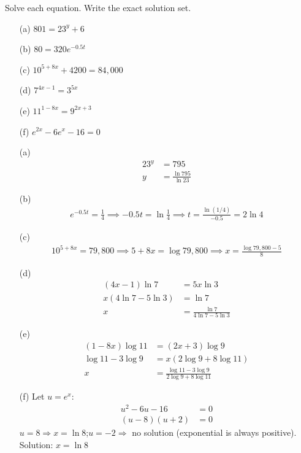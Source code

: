 \documentclass{ximera}
\begin{document}
\begin{problem}
Solve each equation. Write the exact solution set.
\begin{enumerate}
  \item[(a)] $801 = 23^y + 6$
  \medskip
  \item[(b)] $80 = 320e^{-0.5t}$
  \medskip
  \item[(c)] $10^{5+8x} + 4200 = 84{,}000$
  \medskip
  \item[(d)] $7^{4x-1} = 3^{5x}$
  \medskip
  \item[(e)] $11^{1-8x} = 9^{2x+3}$
  \medskip
  \item[(f)] $e^{2x} - 6e^x - 16 = 0$ 
\end{enumerate}

\begin{solution}
\begin{enumerate}
  \item[(a)]
  \begin{align*}
    23^y &= 795\\
    y &= \frac{\ln 795}{\ln 23}
  \end{align*}

  \item[(b)]
  \begin{align*}
    e^{-0.5t} = \tfrac{1}{4} \implies -0.5t = \ln\tfrac{1}{4} \implies t = \frac{\ln(1/4)}{-0.5} = 2\ln 4
  \end{align*}

  \item[(c)]
  \begin{align*}
    10^{5+8x} = 79{,}800 \implies 5+8x = \log 79{,}800 \implies x = \frac{\log 79{,}800 - 5}{8}
  \end{align*}

  \item[(d)]
  \begin{align*}
    (4x-1)\ln 7 &= 5x\ln 3\\
    x(4\ln 7 - 5\ln 3) &= \ln 7\\
    x &= \frac{\ln 7}{4\ln 7 - 5\ln 3}
  \end{align*}

  \item[(e)]
  \begin{align*}
    (1-8x)\log 11 &= (2x+3)\log 9\\
    \log 11 - 3\log 9 &= x(2\log 9 + 8\log 11)\\
    x &= \frac{\log 11 - 3\log 9}{2\log 9 + 8\log 11}
  \end{align*}

  \item[(f)] Let $u = e^x$:
  \begin{align*}
    u^2 - 6u - 16 &= 0\\
    (u-8)(u+2) &= 0
  \end{align*}
  $u=8 \Rightarrow x=\ln 8$;\quad $u=-2 \Rightarrow$ no solution (exponential is always positive).\\
  Solution: $\boxed{x = \ln 8}$
\end{enumerate}
\end{solution}
\end{problem}
\end{document}
